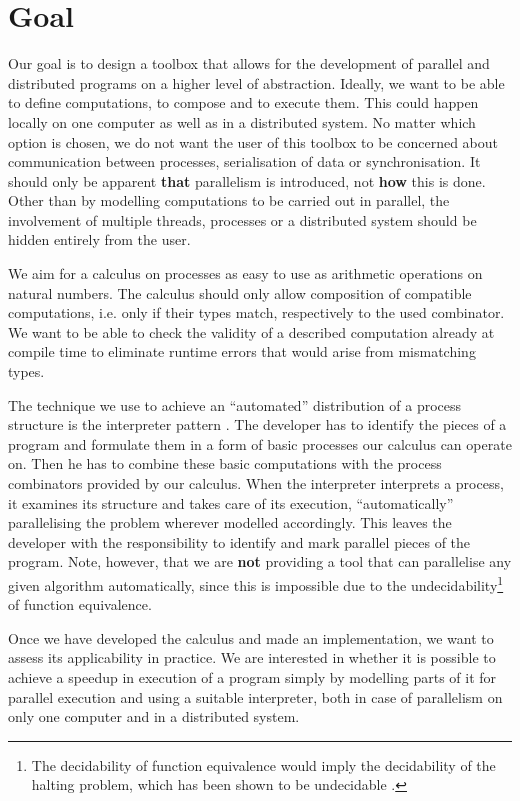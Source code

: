 \section{Goal}
\label{chp:goal}
Our goal is to design a toolbox that allows for the development of parallel and distributed programs on a higher level of abstraction. Ideally, we want to be able to define computations, to compose and to execute them. This could happen locally on one computer as well as in a distributed system. No matter which option is chosen, we do not want the user of this toolbox to be concerned about communication between processes, serialisation of data or synchronisation. It should only be apparent \textbf{that} parallelism is introduced, not \textbf{how} this is done. Other than by modelling computations to be carried out in parallel, the involvement of multiple threads, processes or a distributed system should be hidden entirely from the user.

We aim for a calculus on processes as easy to use as arithmetic operations on natural numbers. The calculus should only allow composition of compatible computations, i.e. only if their types match, respectively to the used combinator. We want to be able to check the validity of a described computation already at compile time to eliminate runtime errors that would arise from mismatching types.

The technique we use to achieve an \enquote{automated} distribution of a process structure is the interpreter pattern \cite{Gamma:1995:DPE:186897}. The developer has to identify the pieces of a program and formulate them in a form of basic processes our calculus can operate on. Then he has to combine these basic computations with the process combinators provided by our calculus. When the interpreter interprets a process, it examines its structure and takes care of its execution, \enquote{automatically} parallelising the problem wherever modelled accordingly. This leaves the developer with the responsibility to identify and mark parallel pieces of the program. Note, however, that we are \textbf{not} providing a tool that can parallelise any given algorithm automatically, since this is impossible due to the undecidability\footnote{The decidability of function equivalence would imply the decidability of the halting problem, which has been shown to be undecidable \citep{Garey:1979:CIG:578533}.} of function equivalence.

Once we have developed the calculus and made an implementation, we want to assess its applicability in practice. We are interested in whether it is possible to achieve a speedup in execution of a program simply by modelling parts of it for parallel execution and using a suitable interpreter, both in case of parallelism on only one computer and in a distributed system.

